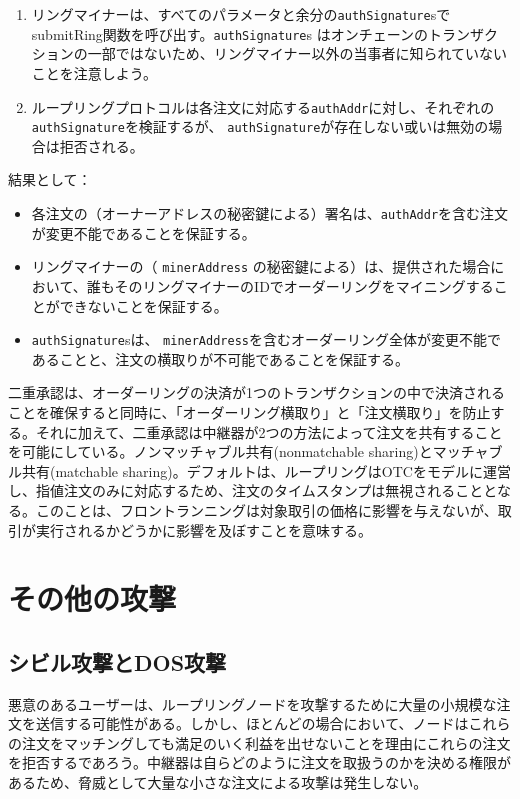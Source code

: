 \documentclass{article}
\begin{document}
\begin{multicols}{2}
\begin{enumerate}
	\item リングマイナーは、すべてのパラメータと余分の\verb|authSignature|sでsubmitRing関数を呼び出す。\verb|authSignature|s はオンチェーンのトランザクションの一部ではないため、リングマイナー以外の当事者に知られていないことを注意しよう。

	\item ループリングプロトコルは各注文に対応する\verb|authAddr|に対し、それぞれの\verb|authSignature|を検証するが、 \verb|authSignature|が存在しない或いは無効の場合は拒否される。


\end{enumerate}

結果として：

\begin{itemize}

	\item  各注文の（オーナーアドレスの秘密鍵による）署名は、\verb|authAddr|を含む注文が変更不能であることを保証する。
	\item  リングマイナーの（ \verb|minerAddress| の秘密鍵による）は、提供された場合において、誰もそのリングマイナーのIDでオーダーリングをマイニングすることができないことを保証する。
	\item  \verb|authSignature|sは、 \verb|minerAddress|を含むオーダーリング全体が変更不能であることと、注文の横取りが不可能であることを保証する。

\end{itemize}

二重承認は、オーダーリングの決済が1つのトランザクションの中で決済されることを確保すると同時に、「オーダーリング横取り」と「注文横取り」を防止する。それに加えて、二重承認は中継器が2つの方法によって注文を共有することを可能にしている。ノンマッチャブル共有(nonmatchable sharing)とマッチャブル共有(matchable sharing)。デフォルトは、ループリングはOTCをモデルに運営し、指値注文のみに対応するため、注文のタイムスタンプは無視されることとなる。このことは、フロントランニングは対象取引の価格に影響を与えないが、取引が実行されるかどうかに影響を及ぼすことを意味する。

\section{その他の攻撃}

\subsection{シビル攻撃とDOS攻撃}

悪意のあるユーザーは、ループリングノードを攻撃するために大量の小規模な注文を送信する可能性がある。しかし、ほとんどの場合において、ノードはこれらの注文をマッチングしても満足のいく利益を出せないことを理由にこれらの注文を拒否するであろう。中継器は自らどのように注文を取扱うのかを決める権限があるため、脅威として大量な小さな注文による攻撃は発生しない。


\end{multicols}
\end{document}
